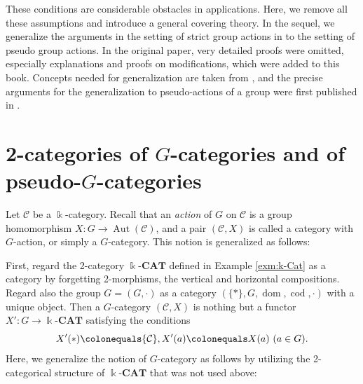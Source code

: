 \documentclass{surv-l}
\numberwithin{equation}{chapter}
\numberwithin{figure}{chapter}
\theoremstyle{plain}
\theoremstyle{definition}
\theoremstyle{remark}
\newcommand{\kCAT}{\Bbbk\text{-}\mathbf{CAT}}
\DeclareMathOperator{\Aut}{Aut}
\DeclareMathOperator{\dom}{dom}
\DeclareMathOperator{\cod}{cod}
\begin{document}
These conditions are considerable obstacles in applications.
Here, we remove all these assumptions and introduce a general covering theory.
In the sequel, we generalize the arguments in the setting of
strict group actions in \cite{Asa12} to the setting of pseudo group actions.
In the original paper, very detailed proofs were omitted, especially
explanations and proofs on modifications,
which were added to this book.
Concepts needed for generalization are taken from \cite{Asa-b}, and
the precise arguments for the generalization to pseudo-actions of a group
were first published in \cite{Asa19}.

\section{2-categories of $G$-categories and of pseudo-$G$-categories}\label{sec:5.1}

Let ${\mathcal{C}}$ be a $\Bbbk$-category.
Recall that an \emph{action} of $G$ on ${\mathcal{C}}$ is a group homomorphism $X\colon G \to \Aut({\mathcal{C}})$, and
a pair $({\mathcal{C}}, X)$ is called a category with $G$-action, or simply a $G$-category.
This notion is generalized as follows:

First, regard the 2-category $\kCAT$ defined in Example \ref{exm:k-Cat}
as a category by forgetting 2-morphisms, the vertical and horizontal compositions.
Regard also the group $G = (G, \cdot)$ as a category $(\{*\}, G, \dom, \cod, \cdot)$ with a unique object.
Then a $G$-category $({\mathcal{C}}, X)$ is nothing but a functor $X'\colon G \to \kCAT$
satisfying the conditions
\begin{equation*}
X'(*)\colonequals  {\mathcal{C}}, X'(a)\colonequals   X(a)\ (a \in G).
\end{equation*}
Here, we generalize the notion of $G$-category as follows
by utilizing the 2-categorical structure of $\kCAT$ that was not used above:
\end{document}
